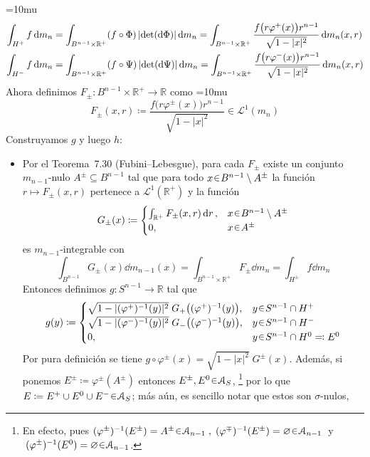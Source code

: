 \begin{sol}
{\thickmuskip=10mu
\begin{align*}
\int_{H^+} f \dd{m_n} 
&= \int_{B^{n-1}\times\mathbb{R}^+} (f\circ\Phi)\, \abs{\det(\dd{\Phi})} \dd{m_n} 
=\int_{B^{n-1}\times\mathbb{R}^+} \frac{f\bigl(r\varphi^+(x)\bigr)r^{n-1}}{\sqrt{1-|x|^2}} \dd{m_n(x,r)}
\\
\int_{H^-} f \dd{m_n} 
&= \int_{B^{n-1}\times\mathbb{R}^+} (f\circ\Psi)\, \abs{\det(\dd{\Psi})} \dd{m_n}
=\int_{B^{n-1}\times\mathbb{R}^+} \frac{f\bigl(r\varphi^-(x)\bigr)r^{n-1}}{\sqrt{1-|x|^2}} \dd{m_n(x,r)}
\end{align*}
}%
Ahora definimos \(F_\pm \colon B^{n-1}\times\mathbb{R}^+ \to \mathbb{R}\) como
{\thickmuskip=10mu
\[
F_\pm(x,r) \coloneqq
\frac{f\bigl(r\varphi^\pm(x)\bigr)r^{n-1}}{\sqrt{1-|x|^2}}
\in \mathcal{L}^1(m_n) 
\]
}%
Construyamos $g$ y luego $h$:
\begin{itemize}
\item 
Por el Teorema~7.30 (Fubini–Lebesgue), para cada \(F_\pm\) existe un conjunto $m_{n-1}$-nulo \(A^\pm\subseteq B^{n-1}\) tal que para todo \(x\en B^{n-1}\setminus A^\pm\) la función \(r\mapsto F_\pm(x,r)\) pertenece a \(\mathcal{L}^1(\mathbb{R}^+)\) y la función
\[
G_\pm(x)
\coloneq 
\begin{cases}
\int_{\mathbb{R}^+} F_\pm(x,r)\dd{r}, &x\en B^{n-1}\setminus A^\pm\\
0, &x\en A^\pm
\end{cases}
\]
es $m_{n-1}$-integrable con 
\[
\int_{B^{n-1}} G_\pm(x) \dd{m_{n-1}(x)}
= \int_{B^{n-1}\times\mathbb{R^+}} F_\pm \dd{m_n}
= \int_{H^\pm} f \dd{m_n}
\]
Entonces definimos $g \colon S^{n-1} \to \mathbb{R}$ tal que
\[
g(y) \coloneq
\begin{cases}
{\sqrt{1-|(\varphi^+)^{-1}(y)|^2}}\;{G_+\bigl((\varphi^+)^{-1}(y)\bigr)}, &y\en S^{n-1} \cap H^+\\
{\sqrt{1-|(\varphi^-)^{-1}(y)|^2}}\;{G_-\bigl((\varphi^-)^{-1}(y)\bigr)}, &y\en S^{n-1} \cap H^-\\
0, &y\en S^{n-1}\cap H^0 \eqcolon E^0
\end{cases}
\]
Por pura definición se tiene $g \circ \varphi^{\pm}(x) = \sqrt{1-|x|^2}\;G^\pm(x)$. Además, si ponemos $E^\pm \coloneq \varphi^\pm(A^\pm)$ entonces $E^\pm,E^0\en\mathcal{A}_{S}$,%
\footnote{
    En efecto, pues $(\varphi^\pm)^{-1}(E^\pm) = A^\pm \en \mathcal{A}_{n-1}\;,\; (\varphi^\mp)^{-1}(E^\pm) = \varnothing \en \mathcal{A}_{n-1}\;$ y $\;(\varphi^\pm)^{-1}(E^0)=\varnothing\en\mathcal{A}_{n-1}$.
}
por lo que $E \coloneq E^+ \cup E^0 \cup E^- \en \mathcal{A}_S$; más aún, es sencillo notar que estos son $\sigma$-nulos,%

\end{itemize}
\end{sol}
